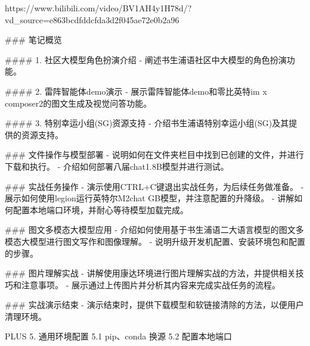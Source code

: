 https://www.bilibili.com/video/BV1AH4y1H78d/?vd_source=e863bcdfddcfda3d2f045ae72e0b2a96

### 笔记概览

#### 1. 社区大模型角色扮演介绍
- 阐述书生浦语社区中大模型的角色扮演功能。

#### 2. 雷阵智能体demo演示
- 展示雷阵智能体demo和零比英特im x composer2的图文生成及视觉问答功能。

#### 3. 特别幸运小组(SG)资源支持
- 介绍书生浦语特别幸运小组(SG)及其提供的资源支持。

### 文件操作与模型部署
- 说明如何在文件夹栏目中找到已创建的文件，并进行下载和执行。
- 介绍如何部署八届chat1.8B模型并进行测试。

### 实战任务操作
- 演示使用CTRL+C键退出实战任务，为后续任务做准备。
- 展示如何使用legion运行英特尔M2chat GB模型，并注意配置的升降级。
- 讲解如何配置本地端口环境，并耐心等待模型加载完成。

### 图文多模态大模型应用
- 介绍如何使用基于书生浦语二大语言模型的图文多模态大模型进行图文写作和图像理解。
- 说明升级开发机配置、安装环境包和配置的步骤。

### 图片理解实战
- 讲解使用康达环境进行图片理解实战的方法，并提供相关技巧和注意事项。
- 展示通过上传图片并分析其内容来完成实战任务的流程。

### 实战演示结束
- 演示结束时，提供下载模型和软链接清除的方法，以便用户清理环境。

PLUS
5. 通用环境配置
5.1 pip、conda 换源
5.2 配置本地端口
